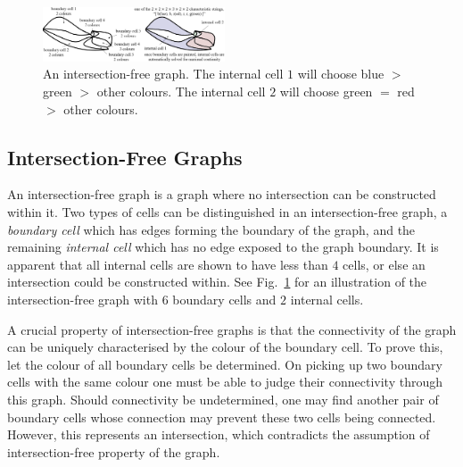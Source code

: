\documentclass[journal]{IEEEtran}
\begin{document}
\begin{figure}[t]
\centering
\includegraphics[width=0.48\textwidth]{figures/characteristic_string}
\caption{An intersection-free graph. The internal cell $1$ will choose blue $>$ green $>$ other colours. The internal cell $2$ will choose green $=$ red $>$ other colours.}\label{fig:characteristic_string}
\end{figure}

\subsection{Intersection-Free Graphs}

An intersection-free graph is a graph where no intersection can be constructed within it. Two types of cells can be distinguished in an intersection-free graph, a \textit{boundary cell} which has edges forming the boundary of the graph, and the remaining \textit{internal cell} which has no edge exposed to the graph boundary. It is apparent that all internal cells are shown to have less than $4$ cells, or else an intersection could be constructed within. 
See Fig.~\ref{fig:characteristic_string} for an illustration of the intersection-free graph with $6$ boundary cells and $2$ internal cells. 

A crucial property of intersection-free graphs is that the connectivity of the graph can be uniquely characterised by the colour of the boundary cell. 
To prove this, let the colour of all boundary cells be determined. On picking up two boundary cells with the same colour one must be able to judge their connectivity through this graph. Should connectivity be undetermined, one may find another pair of boundary cells whose connection may prevent these two cells being connected. However, this represents an intersection, which contradicts the assumption of intersection-free property of the graph. 
\end{document}
